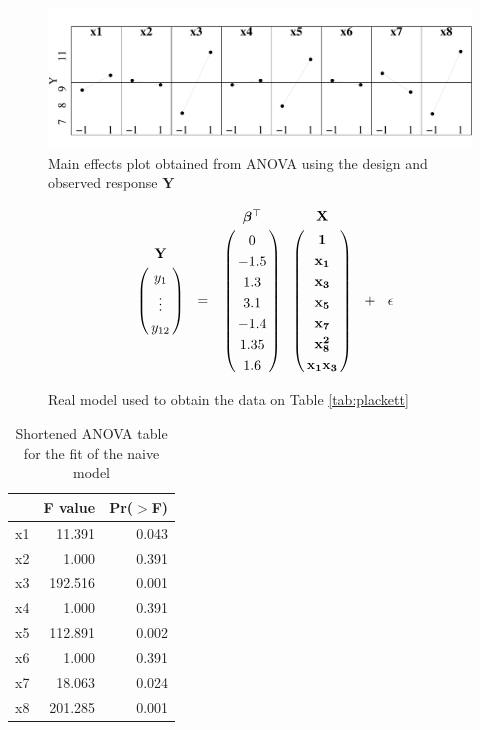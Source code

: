\documentclass[conference]{IEEEtran}
\begin{document}
\begin{center}
\begin{figure}[htbp]
\centering
\includegraphics[width=.95\columnwidth]{./img/main_effects.pdf}
\caption{\label{fig:org4a281ab}
Main effects plot obtained from ANOVA using the design and observed response \(\mathbf{Y}\)}
\end{figure}
\end{center}

\begin{figure}
{\normalsize
\begin{align*}
\bordermatrix{ ~ & \mathbf{Y} \cr & y_1 \cr & \vdots \cr & y_{12}} \ \ =
\bordermatrix{~ & \bm{\beta}^{\top} \cr & 0 \cr & -1.5 \cr & 1.3 \cr & 3.1 \cr & -1.4 \cr & 1.35 \cr & 1.6}
\bordermatrix{~ & \mathbf{X} \cr & \mathbf{1} \cr & \mathbf{x_1} \cr & \mathbf{x_3} \cr & \mathbf{x_5}
\cr & \mathbf{x_7} \cr & \mathbf{x_8^{2}} \cr & \mathbf{x_1x_3}} \ \ +
\ \ \epsilon
\end{align*}
}
\caption{Real model used to obtain the data on Table \ref{tab:plackett}}
\end{figure}

\begin{table}[ht]
\centering
\caption{Shortened ANOVA table for the fit of the naive model}
\begingroup\small
\begin{tabular}{lrr}
  \toprule
 & F value & Pr($>$F) \\
  \midrule
x1          & 11.391 & 0.043 \\
  x2          & 1.000 & 0.391 \\
  x3          & 192.516 & 0.001 \\
  x4          & 1.000 & 0.391 \\
  x5          & 112.891 & 0.002 \\
  x6          & 1.000 & 0.391 \\
  x7          & 18.063 & 0.024 \\
  x8          & 201.285 & 0.001 \\
   \bottomrule
\end{tabular}
\endgroup
\end{table}
\end{document}
